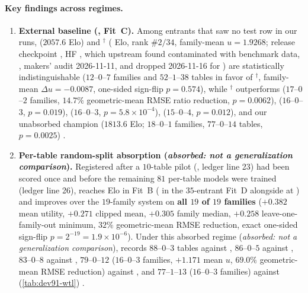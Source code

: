 \paragraph{Key findings across regimes.}
\begin{enumerate}
  \item \textbf{External baseline (, Fit~C).} Among entrants that saw no  test row in our runs,  ($2057.6$ Elo) and $^{\dagger}$ (\BHEloLimiXBoard{} Elo, rank $\#2/34$, family-mean $u = 1.9268$; release checkpoint , HF , which upstream found contaminated with benchmark data, , makers' audit 2026-11-11, and  dropped 2026-11-16 for ) are statistically indistinguishable ($12$--$0$--$7$ families and $52$--$1$--$38$ tables in favor of $^{\dagger}$, family-mean $\Delta u = -0.0087$, one-sided sign-flip $p = 0.574$), while $^{\dagger}$ outperforms  ($17$--$0$--$2$ families, $14.7\%$ geometric-mean RMSE ratio reduction, $p = 0.0062$),  ($16$--$0$--$3$, $p = 0.019$),  ($16$--$0$--$3$, $p = 5.8\times 10^{-4}$),  ($15$--$0$--$4$, $p = 0.012$), and our unabsorbed \regfair{} champion  ($1813.6$ Elo; $18$--$0$--$1$ families, $77$--$0$--$14$ tables, $p = 0.0025$) \est{}.
  \item \textbf{Per-table random-split absorption (\emph{absorbed: not a generalization comparison}).} Registered after a $10$-table pilot (, ledger line 23) had been scored once and before the remaining $81$ per-table models were trained (ledger line 26),  reaches \BHEloGenTwoA{} Elo in Fit~B (\BHEloGenTwoAJoint{} in the $35$-entrant Fit~D alongside  at \BHEloLimiXJoint{}) and improves over the $19$-family system on \textbf{all $19$ of $19$ families} ($+0.382$ mean utility, $+0.271$ clipped mean, $+0.305$ family median, $+0.258$ leave-one-family-out minimum, $32\%$ geometric-mean RMSE reduction, exact one-sided sign-flip $p = 2^{-19} = 1.9\times 10^{-6}$). Under this absorbed regime (\emph{absorbed: not a generalization comparison}),  records $88$--$0$--$3$ tables against , $86$--$0$--$5$ against , $83$--$0$--$8$ against , $79$--$0$--$12$ ($16$--$0$--$3$ families, $+1.171$ mean $u$, $69.0\%$ geometric-mean RMSE reduction) against , and $77$--$1$--$13$ ($16$--$0$--$3$ families) against  (\cref{tab:dev91-wtl}) \est{}.

\end{enumerate}
